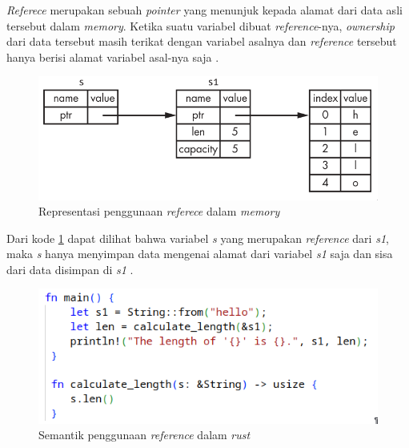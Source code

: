 \emph{Referece} merupakan sebuah \emph{pointer} yang menunjuk kepada alamat dari data asli tersebut dalam \emph{memory}. Ketika suatu variabel dibuat \emph{reference}-nya, \emph{ownership} dari data tersebut masih terikat dengan variabel asalnya dan \emph{reference} tersebut hanya berisi alamat variabel asal-nya saja \citep{rustbook}. 

\begin{figure}[H]
  \centering
  \includegraphics[keepaspectratio, width=12cm]{gambar/reference-memory.png}
  \caption{Representasi penggunaan \emph{referece} dalam \emph{memory} \citep{rustbook}}
  \label{gambar:reference-memory-ilust}
\end{figure}

Dari kode \ref{gambar:reference-memory-ilust} dapat dilihat bahwa variabel \emph{s} yang merupakan \emph{reference} dari \emph{s1}, maka \emph{s} hanya menyimpan data mengenai alamat dari variabel \emph{s1} saja dan sisa dari data disimpan di \emph{s1} \citep{rustbook}.

\begin{figure}[H]
  \centering
  \includegraphics[keepaspectratio, width=12cm]{gambar/reference-rust-code.png}
  \caption{Semantik penggunaan \emph{reference} dalam \emph{rust} \citep{rustbook}}
  \label{gambar:reference-code-rust}
\end{figure}

